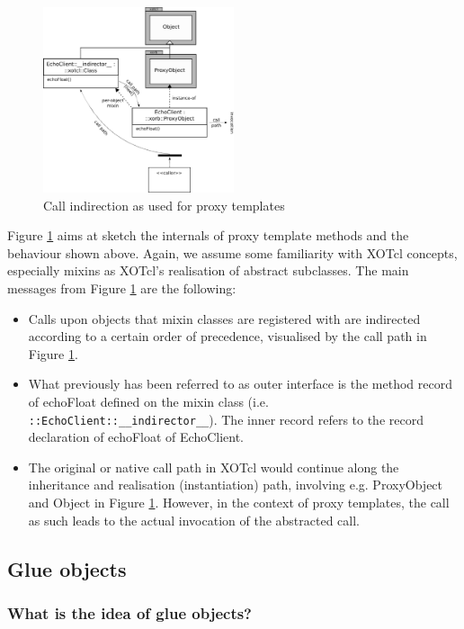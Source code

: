 \begin{figure}[htbp]
\begin{center}
\includegraphics[width=0.5\textwidth]{img/proxy-template.png}
\caption{Call indirection as used for proxy templates}
\label{fig:advanced:templates:1}
\end{center}
\end{figure}

Figure \ref{fig:advanced:templates:1} aims at sketch the internals of proxy template methods and the behaviour shown above. Again, we assume some familiarity with XOTcl concepts, especially mixins as XOTcl's realisation of abstract subclasses. The main messages from Figure \ref{fig:advanced:templates:1} are the following:
\begin{itemize}
\item Calls upon objects that mixin classes are registered with are indirected according to a certain order of precedence, visualised by the call path in Figure  \ref{fig:advanced:templates:1}.
\item What previously has been referred to as outer interface is the method record of echoFloat defined on the mixin class (i.e. \lstinline!::EchoClient::__indirector__!). The inner record refers to the record declaration of echoFloat of EchoClient.
\item The original or native call path in XOTcl would continue along the inheritance and realisation (instantiation) path, involving e.g. ProxyObject and Object in Figure  \ref{fig:advanced:templates:1}. However, in the context of proxy templates, the call as such leads to the actual invocation of the abstracted call.
\end{itemize}
  \subsection{Glue objects}\label{sec:advanced:xorb:gobjects}
  \subsubsection{What is the idea of glue objects?}\label{sec:advanced:xorb:gobjects:what}
